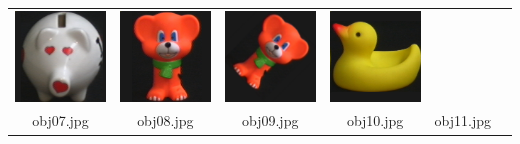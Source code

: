 \begin{table}[H]
\begin{tabu}{|cccccc|}
    \includegraphics[width=0.1\linewidth,height=0.1\linewidth]{imagens/coil_100/animais_brinquedos/obj48__265.png} &
    \includegraphics[width=0.1\linewidth,height=0.1\linewidth]{imagens/coil_100/animais_brinquedos/obj52__0.png} &
    \includegraphics[width=0.1\linewidth,height=0.1\linewidth]{imagens/coil_100/animais_brinquedos/obj52__0_1.png} &
    \includegraphics[width=0.1\linewidth,height=0.1\linewidth]{imagens/coil_100/animais_brinquedos/obj74__0.png} &
    \\
    \scriptsize{obj07.jpg} & \scriptsize{obj08.jpg} & \scriptsize{obj09.jpg} &
    \scriptsize{obj10.jpg} & \scriptsize{obj11.jpg} &
  \end{tabu}
\end{table}

